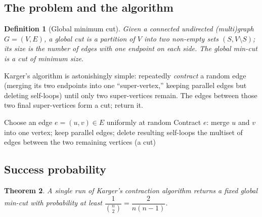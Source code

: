 \documentclass[11pt]{article}
\newtheorem{theorem}{Theorem}[section]
\newtheorem{definition}[theorem]{Definition}
\begin{document}
\subsection{The problem and the algorithm}

\begin{definition}[Global minimum cut]
Given a connected undirected (multi)graph $G = (V, E)$, a \emph{global cut} is a
partition of $V$ into two non-empty sets $(S, V \setminus S)$; its \emph{size} is
the number of edges with one endpoint on each side. The \emph{global min-cut} is a
cut of minimum size.
\end{definition}

Karger's algorithm is astonishingly simple: repeatedly \emph{contract} a random
edge (merging its two endpoints into one ``super-vertex,'' keeping parallel edges
but deleting self-loops) until only two super-vertices remain. The edges between
those two final super-vertices form a cut; return it.

\begin{algorithm}[h]
\caption{Karger's Contraction Algorithm}
\begin{algorithmic}[1]
        \State Choose an edge $e = (u, v) \in E$ uniformly at random
        \State Contract $e$: merge $u$ and $v$ into one vertex; keep parallel
        edges; delete resulting self-loops
    \EndWhile
    \State \Return the multiset of edges between the two remaining vertices (a cut)
\EndFunction
\end{algorithmic}
\end{algorithm}

\subsection{Success probability}

\begin{theorem}
\label{thm:karger}
A single run of Karger's contraction algorithm returns a fixed global min-cut with
probability at least $\dfrac{1}{\binom{n}{2}} = \dfrac{2}{n(n-1)}$.
\end{theorem}
\end{document}
